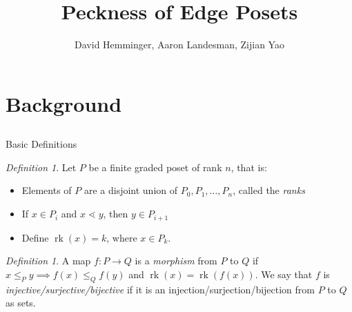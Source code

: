 \documentclass{beamer}
\title{Peckness of Edge Posets}
\author{David Hemminger\inst{1}, Aaron Landesman\inst{2}, Zijian Yao\inst{3}}
\institute[VFU] %
{
  \inst{1}
  Duke University
,
  \inst{2}
  Harvard University
  ,
  \inst{3}
  Brown University
}
\theoremstyle{remark}
\newtheorem{defn}[thm]{Definition}
\newcommand\rk{\operatorname{rk}}
\begin{document}
\begin{frame}
	\titlepage
\end{frame}


\section{Background}
\subsection{}




\begin{frame}{Basic Definitions}
\begin{defn}
Let $P$ be a finite graded poset of rank $n$, that is:
\begin{itemize}
\item Elements of $P$ are a disjoint union of $P_0,P_1,\ldots,P_n$, called the \textit{ranks}
\item If $x\in P_i$ and $x\lessdot y$, then $y\in P_{i+1}$
\item Define $\rk(x) = k$, where $x\in P_k$.
\end{itemize}
\end{defn}

\begin{defn}
A map $f\colon P\rightarrow Q$ is a \textit{morphism} from $P$ to $Q$ if $x\le_P y \implies f(x)\le_Q f(y)$ and $\rk(x) = \rk(f(x))$.  We say that $f$ is \textit{injective/surjective/bijective} if it is an injection/surjection/bijection from $P$ to $Q$ as sets.
\end{defn}
\end{frame}
\end{document}
